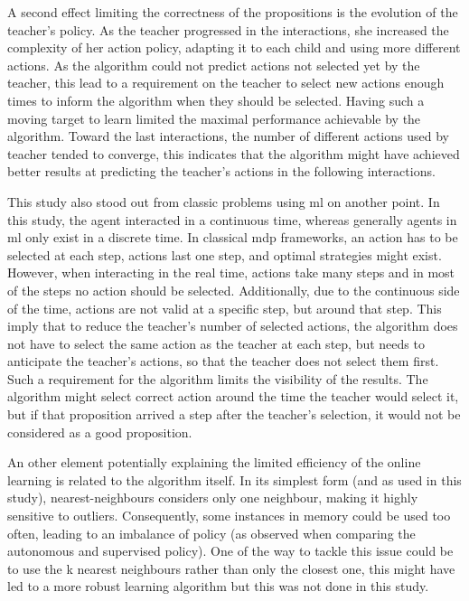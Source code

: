 A second effect limiting the correctness of the propositions is the evolution of the teacher's policy. As the teacher progressed in the interactions, she increased the complexity of her action policy, adapting it to each child and using more different actions. As the algorithm could not predict actions not selected yet by the teacher, this lead to a requirement on the teacher to select new actions enough times to inform the algorithm when they should be selected. Having such a moving target to learn limited the maximal performance achievable by the algorithm. Toward the last interactions, the number of different actions used by teacher tended to converge, this indicates that the algorithm might have achieved better results at predicting the teacher's actions in the following interactions.

This study also stood out from classic problems using \gls{ml} on another point. In this study, the agent interacted in a continuous time, whereas generally agents in \gls{ml} only exist in a discrete time. In classical \gls{mdp} frameworks, an action has to be selected at each step, actions last one step, and optimal strategies might exist. However, when interacting in the real time, actions take many steps and in most of the steps no action should be selected. Additionally, due to the continuous side of the time, actions are not valid at a specific step, but around that step. This imply that to reduce the teacher's number of selected actions, the algorithm does not have to select the same action as the teacher at each step, but needs to anticipate the teacher's actions, so that the teacher does not select them first. Such a requirement for the algorithm limits the visibility of the results. The algorithm might select correct action around the time the teacher would select it, but if that proposition arrived a step after the teacher's selection, it would not be considered as a good proposition.

An other element potentially explaining the limited efficiency of the online learning is related to the algorithm itself. In its simplest form (and as used in this study), nearest-neighbours considers only one neighbour, making it highly sensitive to outliers. Consequently, some instances in memory could be used too often, leading to an imbalance of policy (as observed when comparing the autonomous and supervised policy). One of the way to tackle this issue could be to use the k nearest neighbours rather than only the closest one, this might have led to a more robust learning algorithm but this was not done in this study.

